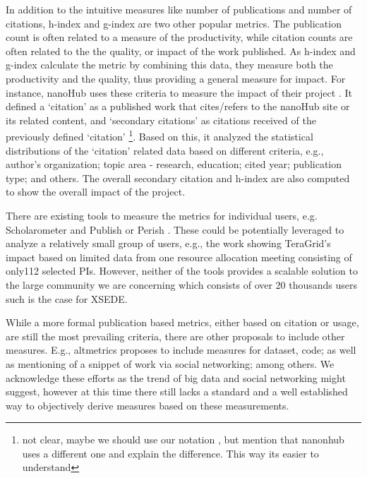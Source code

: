 \documentclass{sig-alternate}
\begin{document}
In addition to the intuitive measures like number of publications and number of citations, h-index \cite{hirsch2005index} and g-index \cite{egghe2006theory} are two other popular metrics. The publication count is often related to a measure of the productivity, while citation counts are often related to the the quality, or impact of the work published. As h-index and g-index calculate the metric by combining this data, they measure both the productivity and the quality, thus providing a general measure for impact. For instance, nanoHub uses these criteria to measure the impact of their project \cite{www-nanohubcite}. It defined a `citation' as a published work that cites/refers to the nanoHub site or its related content, and `secondary citations' as citations received of the previously defined `citation' \footnote{not clear, maybe we should use our notation , but mention that nanonhub uses a different one and explain the difference. This way its easier to understand}. Based on this, it analyzed the statistical distributions of the `citation' related data based on different criteria, e.g., author's organization; topic area - research, education; cited year; publication type; and others. The overall secondary citation and h-index are also computed to show the overall impact of the project. 
 
There are existing tools to measure the metrics for individual users, e.g. Scholarometer \cite{kaur2012scholarometer} and Publish or Perish \cite{www-pop}. These could be potentially leveraged to analyze a relatively small group of users, e.g., the work \cite{bollen2011and} showing TeraGrid's impact based on limited data from one resource allocation meeting consisting of  only112 selected PIs. 
However, neither of the tools provides a scalable solution to the large community we are concerning which consists of over 20 thousands users such is the case for XSEDE.
 
While a more formal publication based metrics, either based on citation or usage, are still the most prevailing criteria, there are other proposals to include other measures. E.g., altmetrics \cite{www-altmetrics} proposes to include measures for dataset, code; as well as mentioning of a snippet of work via social networking; among others. We acknowledge these efforts as the trend of big data and social networking might suggest, however at this time there still lacks a standard and a well established way to objectively derive measures based on these measurements. 
 
 
% 
 
\end{document}
